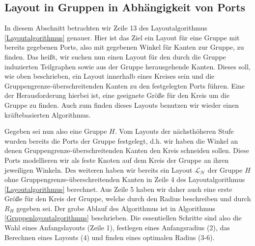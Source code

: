 
\subsection{Layout in Gruppen in Abhängigkeit von Ports}

In diesem Abschnitt betrachten wir Zeile 13 des Layoutalgorithmus \ref{Layoutalgorithmus} genauer. 
Hier ist das Ziel ein Layout für eine Gruppe mit bereits gegebenen Ports, also mit gegebenen Winkel für Kanten zur Gruppe, zu finden.
Das heißt, wir suchen nun einen Layout für den durch die Gruppe induzierten Teilgraphen sowie aus der Gruppe herausgehende Kanten.
Dieses soll, wie oben beschrieben, ein Layout innerhalb eines Kreises sein und die Gruppengrenze-überschreitenden Kanten zu den festgelegten Ports führen.
Eine der Herausforderung hierbei ist, eine geeignete Größe für den Kreis um die Gruppe zu finden. Auch zum finden dieses Layouts benutzen wir wieder einen kräftebasierten Algorithmus.


Gegeben sei nun also eine Gruppe $H$. Vom Layouts der nächsthöheren Stufe wurden bereits die Ports der Gruppe festgelegt, d.h. wir haben die Winkel an denen Gruppengrenze-überschreitenden Kanten den Kreis schneiden sollen. Diese Ports modellieren wir als feste Knoten auf dem Kreis der Gruppe an ihren jeweiligen Winkeln.
Des weiteren haben wir bereits ein Layout $\mathcal{L_H}$ der Gruppe $H$ ohne Gruppengrenze-überschreitenden Kanten in Zeile 4 des Layoutalgorithmus \ref{Layoutalgorithmus}  berechnet.
Aus Zeile 5 haben wir daher auch eine erste Größe für den Kreis der Gruppe, welche durch den Radius beschreiben und durch $R_H$ gegeben sei. 
Der grobe Ablauf des Algorithmus ist in Algorithmus \ref{Gruppenlayoutalgorithmus} beschrieben. Die essentiellen Schritte sind also die Wahl eines Anfangslayouts (Zeile 1), festlegen eines Anfangsradius (2), das Berechnen eines Layouts (4) und finden eines optimalen Radius (3-6).

